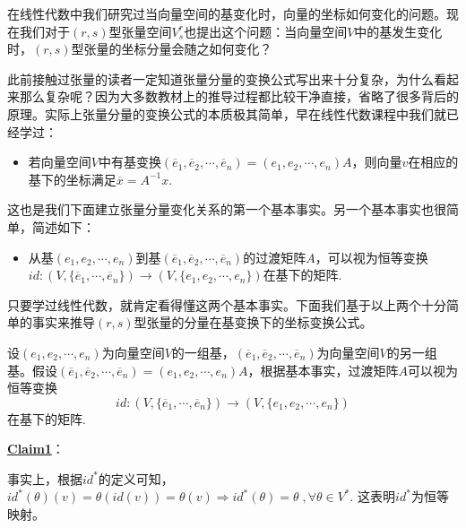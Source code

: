 在线性代数中我们研究过当向量空间的基变化时，向量的坐标如何变化的问题。现在我们对于$(r,s)$型张量空间$V^{r}_{s}$也提出这个问题：当向量空间$V$中的基发生变化时，$(r,s)$型张量的坐标分量会随之如何变化？

此前接触过张量的读者一定知道张量分量的变换公式写出来十分复杂，为什么看起来那么复杂呢？因为大多数教材上的推导过程都比较干净直接，省略了很多背后的原理。实际上张量分量的变换公式的本质极其简单，早在线性代数课程中我们就已经学过：
\begin{itemize}
	\item[$\bullet$] 若向量空间$V$中有基变换$(\overline{e}_{1},\overline{e}_{2},\cdots,\overline{e}_{n})=(e_{1},e_{2},\cdots,e_{n})A$，则向量$v$在相应的基下的坐标满足$\overline{x}=A^{-1}x$.
\end{itemize}
这也是我们下面建立张量分量变化关系的第一个基本事实。另一个基本事实也很简单，简述如下：
\begin{itemize}
	\item[$\bullet$] 从基$(e_{1},e_{2},\cdots,e_{n})$到基$(\overline{e}_{1},\overline{e}_{2},\cdots,\overline{e}_{n})$的过渡矩阵$A$，可以视为恒等变换$id:\left(V,\{\overline{e}_{1},\cdots,\overline{e}_{n} \} \right)\longrightarrow \left(V,\{e_{1},e_{2},\cdots,e_{n} \} \right)$在基下的矩阵.
\end{itemize}
只要学过线性代数，就肯定看得懂这两个基本事实。下面我们基于以上两个十分简单的事实来推导$(r,s)$型张量的分量在基变换下的坐标变换公式。

设$(e_{1},e_{2},\cdots,e_{n})$为向量空间$V$的一组基，$(\overline{e}_{1},\overline{e}_{2},\cdots,\overline{e}_{n})$为向量空间$V$的另一组基。假设$(\overline{e}_{1},\overline{e}_{2},\cdots,\overline{e}_{n})=(e_{1},e_{2},\cdots,e_{n})A$，根据基本事实，过渡矩阵$A$可以视为恒等变换
\[id:\left(V,\{\overline{e}_{1},\cdots,\overline{e}_{n} \} \right)\longrightarrow \left(V,\{e_{1},e_{2},\cdots,e_{n} \} \right)\]
在基下的矩阵.

\textbf{\underline{Claim1}}：{}

事实上，根据$id^{\ast}$的定义可知，$id^{\ast}(\theta)(v)=\theta(id(v))=\theta(v)\Rightarrow id^{\ast}(\theta)=\theta\;,\forall \theta\in V^{\ast} $. 这表明$id^{\ast}$为恒等映射。


